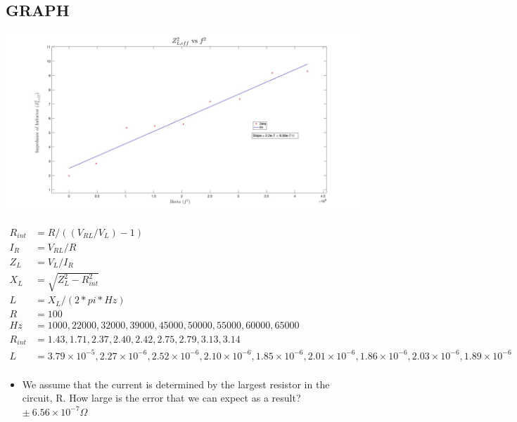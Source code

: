 \documentclass{article}
\def\F#1{\(#1\)}
\begin{document}
\begin{center}
  \subsection*{GRAPH}
  \includegraphics[width=\textwidth]{graph.jpg}
\end{center}
\begin{align*}
  R_{int} &= R/((V_{RL}/V_{L}) - 1)\\
  I_R &= V_{RL} / R\\
  Z_L &= V_L / I_R\\
  X_L &= \sqrt{ Z_L^2 - R_{int}^2}\\
  L &= X_L / (2 * pi * Hz)\\
  R &= 100\\
  Hz &= 1000,22000,32000,39000,45000,50000,55000,60000,65000\\
  R_{int} &= 1.43,1.71,2.37,2.40,2.42,2.75,2.79,3.13,3.14\\
  L &= 3.79\times{10}^{ - 5},2.27\times{10}^{ - 6},2.52\times{10}^{ - 6},2.10\times{10}^{ - 6},1.85\times{10}^{ - 6},2.01\times{10}^{ - 6},1.86\times{10}^{ - 6},2.03\times{10}^{ - 6},1.89\times{10}^{ - 6}\\
\end{align*}
\begin{itemize}
  \item We assume that the current is determined by the largest resistor in the circuit, R. How large is the error that we can expect as a result? \F{\pm\ 6.56\times{10}^{-7}\Omega}
\end{itemize}
\end{document}

